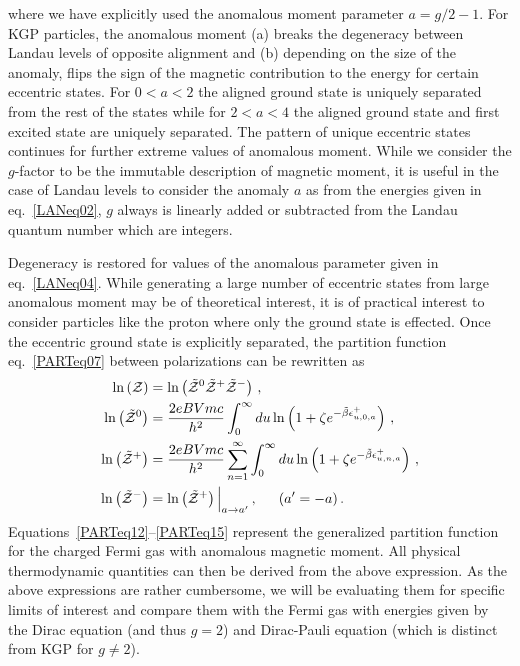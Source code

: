 \documentclass[
aps,
pra,
twocolumn,
showpacs,
preprintnumbers,
amsmath,
amssymb,
footinbib
]{revtex4-2}
\begin{document}
where we have explicitly used the anomalous moment parameter $a=g/2-1$. For KGP particles, the anomalous moment (a) breaks the degeneracy between Landau levels of opposite alignment and (b) depending on the size of the anomaly, flips the sign of the magnetic contribution to the energy for certain eccentric states. For $0<a<2$ the aligned ground state is uniquely separated from the rest of the states while for $2<a<4$ the aligned ground state and first excited state are uniquely separated. The pattern of unique eccentric states continues for further extreme values of anomalous moment. While we consider the $g$-factor to be the immutable description of magnetic moment, it is useful in the case of Landau levels to consider the anomaly $a$ as from the energies given in eq.~\eqref{LANeq02}, $g$ always is linearly added or subtracted from the Landau quantum number which are integers.

Degeneracy is restored for values of the anomalous parameter given in eq.~\eqref{LANeq04}. While generating a large number of eccentric states from large anomalous moment may be of theoretical interest, it is of practical interest to consider particles like the proton where only the ground state is effected. Once the eccentric ground state is explicitly separated, the partition function eq.~\eqref{PARTeq07} between polarizations can be rewritten as
\begin{alignat}{1}
  \label{PARTeq12} \ln\left(\mathcal{Z}\right)&=\ln\left(\tilde{\mathcal{Z}}^{0}\tilde{\mathcal{Z}}^{+}\tilde{\mathcal{Z}}^{-}\right)\,,\\
  \label{PARTeq13} \ln\left(\tilde{\mathcal{Z}}^{0}\right)&=\frac{2eBVmc}{h^{2}}\int_{0}^{\infty}du\ln\left(1+\zeta e^{-\tilde{\beta}\epsilon_{u,0,a}^{+}}\right)\,,\\
    \label{PARTeq14} \ln\left(\tilde{\mathcal{Z}}^{+}\right)&=\frac{2eBVmc}{h^{2}}\sum_{n=1}^{\infty}\int_{0}^{\infty}du\ln\left(1+\zeta e^{-\tilde{\beta}\epsilon_{u,n,a}^{+}}\right)\,,\\
    \label{PARTeq15} \ln\left(\tilde{\mathcal{Z}}^{-}\right)&=\ln\left(\tilde{\mathcal{Z}}^{+}\right)\Big|_{a\rightarrow a'}\,,\indent (a'=-a)\,. 
\end{alignat}
Equations~\eqref{PARTeq12}--\eqref{PARTeq15} represent the generalized partition function for the charged Fermi gas with anomalous magnetic moment. All physical thermodynamic quantities can then be derived from the above expression. As the above expressions are rather cumbersome, we will be evaluating them for specific limits of interest and compare them with the Fermi gas with energies given by the Dirac equation (and thus $g=2$) and Dirac-Pauli equation (which is distinct from KGP for $g\neq2$).
\end{document}
